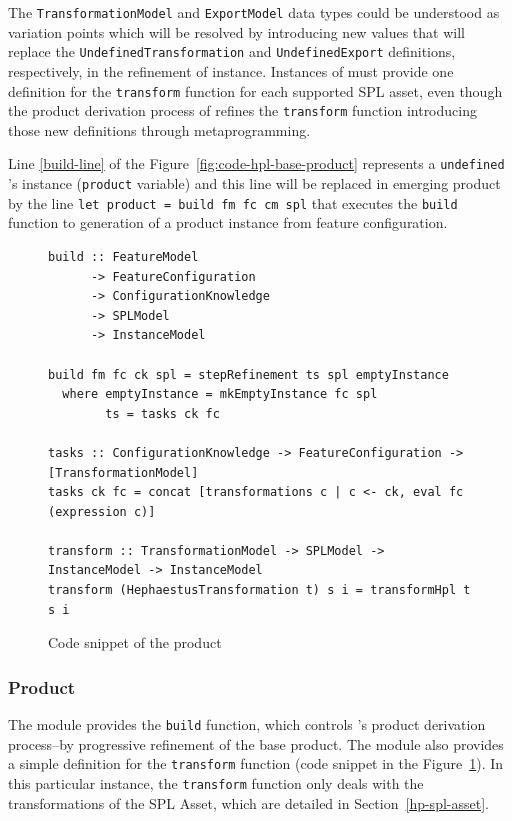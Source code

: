 The \texttt{TransformationModel} and \texttt{ExportModel} data types could be understood as variation points which will be resolved by introducing new values ​​that will replace the \texttt{UndefinedTransformation} and \texttt{UndefinedExport} definitions, respectively, in the refinement of \hpl{} instance. Instances of \hpl{} must provide one definition for the \texttt{transform} function for each supported SPL asset, even though the product derivation process of \hpl{} refines the \texttt{transform} function introducing those new definitions through metaprogramming.

Line \ref{build-line} of the Figure~\ref{fig:code-hpl-base-product} represents a \texttt{undefined} \hpl's instance (\texttt{product} variable) and this line will be replaced in emerging product by the line \texttt{let product = build fm fc cm spl} that executes the \texttt{build} function to generation of a product \hpl{} instance from feature configuration.


\begin{figure}
\begin{lstlisting}
build :: FeatureModel
      -> FeatureConfiguration
      -> ConfigurationKnowledge
      -> SPLModel
      -> InstanceModel

build fm fc ck spl = stepRefinement ts spl emptyInstance
  where emptyInstance = mkEmptyInstance fc spl
        ts = tasks ck fc

tasks :: ConfigurationKnowledge -> FeatureConfiguration -> [TransformationModel]
tasks ck fc = concat [transformations c | c <- ck, eval fc (expression c)]

transform :: TransformationModel -> SPLModel -> InstanceModel -> InstanceModel
transform (HephaestusTransformation t) s i = transformHpl t s i
\end{lstlisting}
\caption{Code snippet of the \hp{} product}
\label{fig:code-hp-product}
\end{figure}


\subsubsection{\hp{} Product} 
\label{hp-product}

The module provides the \texttt{build} function, which controls \hpl{}'s product derivation process--by progressive refinement of the base product. The module also provides a simple definition for the \texttt{transform} function (code snippet in the Figure~\ref{fig:code-hp-product}).  In this particular instance, the \texttt{transform} function only deals with the transformations of the \hp{} SPL Asset, which are detailed in Section~\ref{hp-spl-asset}.


